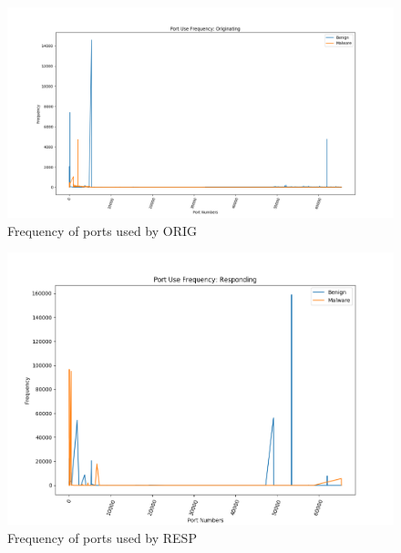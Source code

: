 \begin{figure}[htb]
	\centering
	\includegraphics[width=1\textwidth]{images/orig-port-freq.png}
	\caption{Frequency of ports used by ORIG} 
	\label{fig:orig-port-freq}
\end{figure}

\begin{figure}[htb]
	\centering
	\includegraphics[width=1\textwidth]{images/resp-port-freq.png}
	\caption{Frequency of ports used by RESP} 
	\label{fig:resp-port-freq}
\end{figure}

